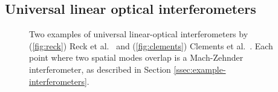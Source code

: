 \subsection{Universal linear optical interferometers}
\label{ssec:universal-lo}

\begin{figure}
\hfill
{}
\caption[Two examples of universal linear-optical interferometers]{\label{fig:universal-lo}Two examples of universal linear-optical interferometers by (\ref{fig:reck}) Reck et al.~\cite{reck1994} and (\ref{fig:clements}) Clements et al.~\cite{clements2016}. Each point where two spatial modes overlap is a Mach-Zehnder interferometer, as described in Section \ref{ssec:example-interferometers}.}
\end{figure}


